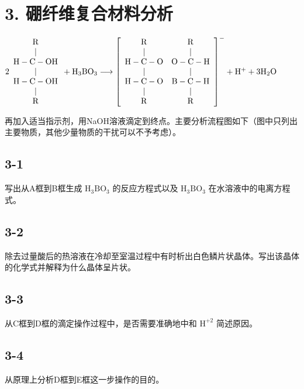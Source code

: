 \section*{3. 硼纤维复合材料分析}
$
2 \begin{array}{c} \mathrm{R} \\ | \\ \mathrm{H} - \mathrm{C} - \mathrm{OH} \\ | \\ \mathrm{H} - \mathrm{C} - \mathrm{OH} \\ | \\ \mathrm{R} \end{array} + \mathrm{H} _ {3} \mathrm{BO} _ {3} \longrightarrow \left[ \begin{array}{c c} \mathrm{R} & \mathrm{R} \\ | & | \\ \mathrm{H} - \mathrm{C} - \mathrm{O} & \mathrm{O} - \mathrm{C} - \mathrm{H} \\ | & | \\ \mathrm{H} - \mathrm{C} - \mathrm{O} & \mathrm{B} - \mathrm{C} - \mathrm{H} \\ | & | \\ \mathrm{R} & \mathrm{R} \end{array} \right] ^ {-} + \mathrm{H} ^ {+} + 3 \mathrm{H} _ {2} \mathrm{O}
$

再加⼊适当指⽰剂，⽤NaOH溶液滴定到终点。主要分析流程图如下（图中只列出主要物质，其他少量物质的⼲扰可以不予考虑）。

\subsection*{3-1}
写出从A框到B框⽣成 $\mathrm { H _ { 3 } B O _ { 3 } }$ 的反应⽅程式以及 $\mathrm { H _ { 3 } B O _ { 3 } }$ 在⽔溶液中的电离⽅程式。

\subsection*{3-2}
除去过量酸后的热溶液在冷却⾄室温过程中有时析出⽩⾊鳞⽚状晶体。写出该晶体的化学式并解释为什么晶体呈⽚状。

\subsection*{3-3}
从C框到D框的滴定操作过程中，是否需要准确地中和 $\mathrm { H } ^ { + 2 }$ 简述原因。

\subsection*{3-4}
从原理上分析D框到E框这⼀步操作的⽬的。

